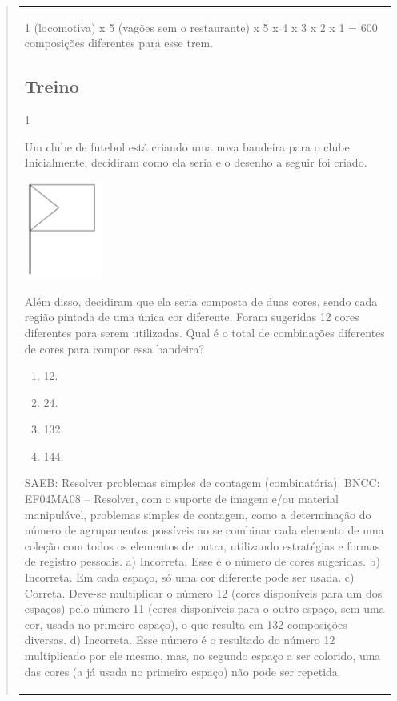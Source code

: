 \begin{mdframed}[linewidth=2pt,linecolor=salmao,roundcorner=2pt]
\begin{itemize}
{\begin{itemize}
\begin{escolha}
{\begin{quote}
{\begin{escolha}
{{{{{\begin{longtable}[]{@{}l@{}}
\begin{itemize}
{1 (locomotiva) x 5 (vagões sem o restaurante) x 5 x 4 x 3 x 2 x 1 = 600
composições diferentes para esse trem.

\subsection{Treino}

\num{1}

Um clube de futebol está criando uma nova bandeira para o clube.
Inicialmente, decidiram como ela seria e o desenho a seguir foi criado.

\includegraphics[width=1.02511in,height=1.26282in]{media/image140.png}

Além disso, decidiram que ela seria composta de duas cores, sendo cada
região pintada de uma única cor diferente. Foram sugeridas 12 cores
diferentes para serem utilizadas. Qual é o total de combinações
diferentes de cores para compor essa bandeira?

\begin{enumerate}
\item
  12.
\item
  24.
\item
  132.
\item
  144.
\end{enumerate}

SAEB: Resolver problemas simples de contagem (combinatória).
BNCC: EF04MA08 -- Resolver, com o suporte de imagem e/ou material manipulável, problemas simples
de contagem, como a determinação do número de agrupamentos possíveis ao se combinar cada
elemento de uma coleção com todos os elementos de outra, utilizando estratégias e formas de
registro pessoais.
a) Incorreta. Esse é o número de cores sugeridas.
b) Incorreta. Em cada espaço, só uma cor diferente pode ser usada.
c) Correta. Deve-se multiplicar o número 12 (cores disponíveis para um dos espaços) pelo número 11 (cores disponíveis para o outro espaço, sem uma cor, usada no primeiro espaço), o que resulta em 132 composições diversas.
d) Incorreta. Esse número é o resultado do número 12 multiplicado por ele mesmo, mas, no segundo espaço a ser colorido, uma das cores (a já usada no primeiro espaço) não pode ser repetida.

}
\end{itemize}
\end{longtable}}}}}}
\end{escolha}}
\end{quote}}
\end{escolha}
\end{itemize}}
\end{itemize}
\end{mdframed}
